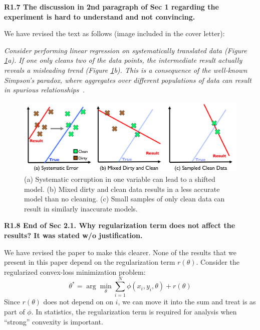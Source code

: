 \vspace{0.5em}

\noindent\textbf{R1.7 The discussion in 2nd paragraph of Sec 1 regarding the experiment is hard to understand and not convincing.}

\noindent We have revised the text as follows (image included in the cover letter):

\emph{Consider performing linear regression on systematically translated data (Figure \ref{update-arch-coverletter}a).
If one only cleans two of the data points, the intermediate result actually reveals a misleading trend (Figure \ref{update-arch-coverletter}b).
This is a consequence of the well-known Simpson's paradox, where aggregates over different populations of data can result in spurious relationships~\cite{simpson1951interpretation}.}

\begin{figure}[ht!]
\centering
 \includegraphics[width=\columnwidth]{figs/update-arch.png}
 \caption{(a) Systematic corruption in one variable can lead to a shifted model. 
 (b) Mixed dirty and clean data results in a less accurate model than no cleaning.
(c) Small samples of only clean data can result in similarly inaccurate models. \label{update-arch-coverletter}}
\end{figure}

\vspace{0.5em}

\noindent\textbf{R1.8 End of Sec 2.1. Why regularization term does not affect the results? It was stated w/o justification.}

\noindent We have revised the paper to make this clearer.
None of the results that we present in this paper depend on the regularization term $r(\theta)$.
Consider the regularized convex-loss minimization problem:
\[
 \theta^{*}=\arg\min_{\theta}\sum_{i=1}^{N}\phi(x_{i},y_{i},\theta) + r(\theta)
\]
Since $r(\theta)$ does not depend on on $i$, we can move it into the sum and treat is as part of $\phi$.
In statistics, the regularization term is required for analysis when ``strong'' convexity is important.


